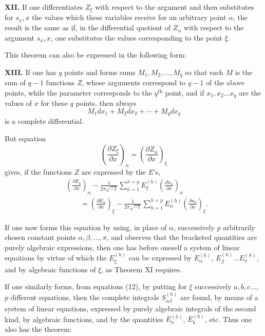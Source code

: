 \documentclass[10pt]{article}
\begin{document}
\noindent\textbf{XII.} If one differentiates \(Z_\xi\) with respect to the argument and then substitutes for \(s_x,x\) the values which these variables receive for an arbitrary point \(\alpha\), the result is the same as if, in the differential quotient of \(Z_\alpha\) with respect to the argument \(s_x,x\), one substitutes the values corresponding to the point \(\xi\).

This theorem can also be expressed in the following form:

\noindent\textbf{XIII.} If one has \(q\) points and forms sums \(M_1,M_2,\ldots,M_q\) so that each \(M\) is the sum of \(q-1\) functions \(Z\), whose arguments correspond to \(q-1\) of the above points, while the parameter corresponds to the \(q^{\mathrm{th}}\) point, and if \(x_1,x_2\ldots x_q\) are the values of \(x\) for these \(q\) points, then always
\[
M_1dx_1+M_2dx_2+\cdots+M_qdx_q
\]
is a complete differential.

But equation
\[
\tag{17}
\left(\frac{\partial Z_\xi}{\partial x}\right)_\alpha=
\left(\frac{\partial Z_\alpha}{\partial x}\right)_\xi
\]
gives, if the functions \(Z\) are expressed by the \(E\)'s,
\[
\tag{18}
\begin{aligned}
&\left(\frac{\partial E_\xi}{\partial x}\right)_\alpha
-\frac{1}{2\pi\sqrt{-1}}\sum_{h=1}^{h=p}E_\xi^{(h)}\left(\frac{\partial u_h}{\partial x}\right)_\alpha\\
&\qquad=\left(\frac{\partial E_\alpha}{\partial x}\right)_\xi
-\frac{1}{2\pi\sqrt{-1}}\sum_{h=1}^{h=p}E_\alpha^{(h)}\left(\frac{\partial u_h}{\partial x}\right)_\xi.
\end{aligned}
\]

If one now forms this equation by using, in place of \(\alpha\), successively \(p\) arbitrarily chosen constant points \(\alpha,\beta,\ldots,\pi\), and observes that the bracketed quantities are purely algebraic expressions, then one has before oneself a system of linear equations by virtue of which the \(E_\xi^{(h)}\) can be expressed by \(E_\alpha^{(h)}\), \(E_\beta^{(h)}\ldots E_\pi^{(h)}\), and by algebraic functions of \(\xi\), as Theorem XI requires.

If one similarly forms, from equations (12), by putting for \(\xi\) successively \(a,b,c\ldots\), \(p\) different equations, then the complete integrals \(S_{\alpha\beta}^{(h)}\) are found, by means of a system of linear equations, expressed by purely algebraic integrals of the second kind, by algebraic functions, and by the quantities \(E_a^{(h)}\), \(E_b^{(h)}\), etc. Thus one also has the theorem:
\end{document}
